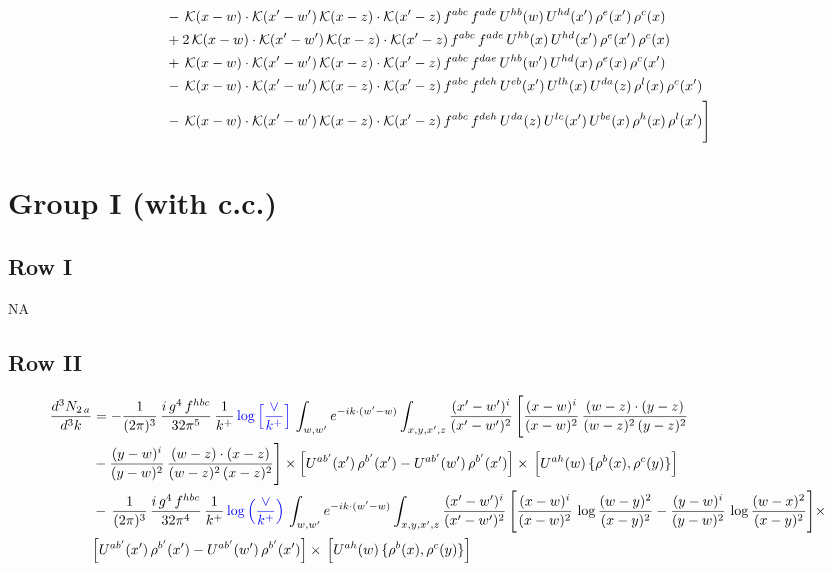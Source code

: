 \documentclass[9pt]{article}
\numberwithin{equation}{section}
\begin{document}
\begin{align}
&-\,\mathcal{K}(x-w)\cdot\mathcal{K}(x'-w')\,\mathcal{K}(x-z)\cdot\mathcal{K}(x'-z)\,f^{abc}\,f^{ade}\,U^{hb}(w)\,U^{hd}(x')\,\rho^{e}(x')\,\rho^{c}(x)\notag\\
&+2\,\mathcal{K}(x-w)\cdot\mathcal{K}(x'-w')\,\mathcal{K}(x-z)\cdot\mathcal{K}(x'-z)\,f^{abc}\,f^{ade}\,U^{hb}(x)\,U^{hd}(x')\,\rho^{e}(x')\,\rho^{c}(x)\notag\\
&+\,\mathcal{K}(x-w)\cdot\mathcal{K}(x'-w')\,\mathcal{K}(x-z)\cdot\mathcal{K}(x'-z)\,f^{abc}\,f^{dae}\,U^{hb}(w')\,U^{hd}(x)\,\rho^{e}(x)\,\rho^{c}(x')\notag\\
&-\,\mathcal{K}(x-w)\cdot\mathcal{K}(x'-w')\,\mathcal{K}(x-z)\cdot\mathcal{K}(x'-z)\,f^{abc}\,f^{deh}\,U^{eb}(x')\,U^{lh}(x)\,U^{da}(z)\,\rho^{l}(x)\,\rho^{c}(x')\notag\\
&-\,\mathcal{K}(x-w)\cdot\mathcal{K}(x'-w')\,\mathcal{K}(x-z)\cdot\mathcal{K}(x'-z)\,f^{abc}\,f^{deh}\,U^{da}(z)\,U^{lc}(x')\,U^{be}(x)\,\rho^{h}(x)\,\rho^{l}(x')\Bigg]
\end{align}
\section{Group I (with c.c.)}
\subsection{Row I}
\textsc{NA}
\subsection{Row II}
\begin{align}
    \frac{d^{3}N_{2\,a}}{d^{3}k} & = -\frac{1}{(2\pi)^{3}}\,\frac{i\,g^{4}\,f^{hbc}}{32\pi^{5}}\,\frac{1}{k^{+}}\,{\color{blue}\log{\left[\frac{\vee}{k^{+}}\right]}}\,
\int_{w,w'} e^{-ik\cdot(w'-w)}\int_{x,y,x',z}\frac{(x'-w')^{i}}{(x'-w')^{2}}\,\Bigg[\frac{(x-w)^{i}}{(x-w)^{2}}\, \frac{(w-z)\cdot (y-z)}{(w-z)^{2}\,(y-z)^{2}}\notag \\ & - \frac{(y-w)^{i}}{(y-w)^{2}}\, \frac{(w-z)\cdot (x-z)}{(w-z)^{2}\,(x-z)^{2}}\Bigg]\times\Big[U^{ab'}(x')\,\rho^{b'}(x')-U^{ab'}(w')\,\rho^{b'}(x')\Big]\times\, \Big[U^{ah}(w)\,\{\rho^{b}(x),\rho^{c}(y)\}\Big]\notag \\ & -\,\frac{1}{(2\pi)^{3}}\,\frac{i\,g^{4}\,f^{hbc}}{32\pi^{4}}\,\frac{1}{k^{+}}\,{\color{blue}\log\left(\frac{\vee}{k^{+}}\right)}\,
\int_{w,w'} e^{-ik\cdot(w'-w)}\int_{x,y,x',z}\frac{(x'-w')^{i}}{(x'-w')^{2}}\,\Bigg[\frac{(x-w)^{i}}{(x-w)^{2}}\,\log\frac{(w-y)^{2}}{(x-y)^{2}}-\frac{(y-w)^{i}}{(y-w)^{2}}\,\log\frac{(w-x)^{2}}{(x-y)^{2}}\Bigg]\times\notag \\ & \Big[U^{ab'}(x')\,\rho^{b'}(x')-U^{ab'}(w')\,\rho^{b'}(x')\Big]\times\, \Big[U^{ah}(w)\,\{\rho^{b}(x),\rho^{c}(y)\}\Big]
\end{align}
\end{document}
